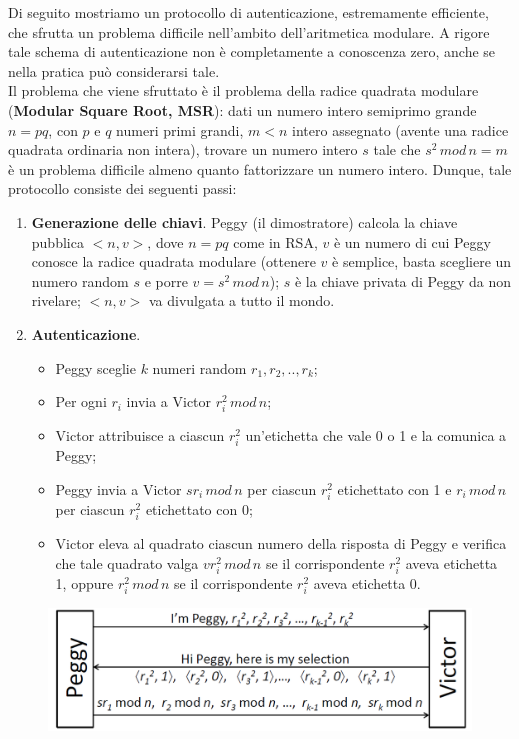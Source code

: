 Di seguito mostriamo un protocollo di autenticazione, estremamente efficiente, che sfrutta un problema difficile nell'ambito dell'aritmetica modulare. A rigore tale schema di autenticazione non è
completamente a conoscenza zero, anche se nella pratica può considerarsi tale. \\
Il problema che viene sfruttato è il problema della radice quadrata modulare (\textbf{Modular Square Root, MSR}): dati un numero intero semiprimo grande $n=pq$, con $p$ e $q$ numeri primi grandi, $m<n$ intero assegnato (avente una radice quadrata ordinaria non intera), trovare un numero intero $s$ tale che $s^2 \, mod \, n=m$ è un problema difficile almeno quanto fattorizzare un numero intero.
Dunque, tale protocollo consiste dei seguenti passi: 
\begin{enumerate}
\item \textbf{Generazione delle chiavi}. Peggy (il dimostratore) calcola la chiave pubblica $<n,v>$, dove $n=pq$ come in RSA, $v$ è un numero di cui Peggy conosce la radice quadrata modulare (ottenere $v$ è semplice, basta scegliere un numero random $s$ e porre $v = s^2 \, mod \, n$); $s$ è la chiave privata di Peggy da non rivelare; $<n,v>$ va divulgata a tutto il mondo.
\item \textbf{Autenticazione}. \begin{itemize}
\item Peggy sceglie $k$ numeri random $r_{1},r_{2},..,r_{k}$;
\item Per ogni $r_{i}$ invia a Victor $r_{i}^2 \, mod \, n$;
\item Victor attribuisce a ciascun $r_{i}^2$ un'etichetta che vale 0 o 1 e la comunica a Peggy;
\item Peggy invia a Victor $sr_{i} \, mod \, n$ per ciascun $r_{i}^2$ etichettato con 1 e $r_{i} \, mod \, n$ per ciascun $r_{i}^2$ etichettato con 0;
\item Victor eleva al quadrato ciascun numero della risposta di Peggy e verifica che tale quadrato valga $vr_{i}^2 \, mod \, n$ se il corrispondente $r_{i}^2$ aveva etichetta 1, oppure $r_{i}^2 \, mod \, n$ se il corrispondente $r_{i}^2$ aveva etichetta 0.
\end{itemize}
\end{enumerate}
\begin{figure}[htbp]
	\centering%
	\subfigure%
	{\includegraphics[scale=0.6, keepaspectratio]{Immagini/chiave_pubblica/zkasmsr_auth.png}}
	\caption{}
\end{figure}

